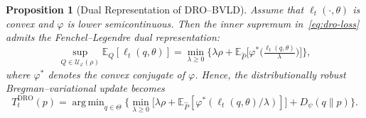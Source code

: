 \documentclass[11pt]{article}
\DeclareMathOperator*{\argmin}{arg\,min}
\theoremstyle{plain}
\newtheorem{proposition}[theorem]{Proposition}
\theoremstyle{definition}
\theoremstyle{remark}
\begin{document}
\begin{proposition}[Dual Representation of DRO–BVLD]
\label{prop:dualDRO}
Assume that $\ell_t(\cdot,\theta)$ is convex and $\varphi$ is lower semicontinuous.  
Then the inner supremum in~\eqref{eq:dro-loss} admits the Fenchel–Legendre dual representation:
\begin{equation}
\sup_{Q\in\mathcal U_\varphi(\rho)} 
\mathbb E_Q[\ell_t(q,\theta)]
=\min_{\lambda\ge0}
\Big\{
\lambda\rho
+\mathbb E_{\hat P}
\big[\varphi^*\!\big(\tfrac{\ell_t(q,\theta)}{\lambda}\big)\big]
\Big\},
\label{eq:dro-dual}
\end{equation}
where $\varphi^*$ denotes the convex conjugate of $\varphi$.
Hence, the distributionally robust Bregman–variational update becomes
\begin{equation}
T_t^{\mathrm{DRO}}(p)
=\argmin_{q\in\Theta}
\Big\{
\min_{\lambda\ge0}
\big[\lambda\rho
+\mathbb E_{\hat P}
[\varphi^*(\ell_t(q,\theta)/\lambda)]\big]
+D_\psi(q\|p)
\Big\}.
\label{eq:dro-update}
\end{equation}
\end{proposition}
\end{document}
